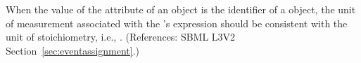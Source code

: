 When the value of the attribute  of an \EventAssignment
object is the identifier of a \SpeciesReference object, the unit of
measurement associated with the \EventAssignment's  expression
should be consistent with the unit of stoichiometry, i.e.,
.  (References: SBML L3V2
Section~\ref{sec:eventassignment}.)
